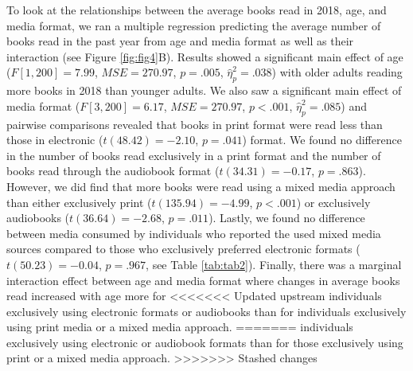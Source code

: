 \documentclass[man, fleqn, noextraspace]{apa6}
\theoremstyle{definition}
\theoremstyle{definition}
\theoremstyle{definition}
\theoremstyle{remark}
\begin{document}
To look at the relationships between the average books read in 2018,
age, and media format, we ran a multiple regression predicting the
average number of books read in the past year from age and media format
as well as their interaction (see Figure \ref{fig:fig4}B). Results
showed a significant main effect of age (\(F[1, 200] = 7.99\),
\(\mathit{MSE} = 270.97\), \(p = .005\), \(\hat{\eta}^2_p = .038\)) with
older adults reading more books in 2018 than younger adults. We also saw
a significant main effect of media format (\(F[3, 200] = 6.17\),
\(\mathit{MSE} = 270.97\), \(p < .001\), \(\hat{\eta}^2_p = .085\)) and
pairwise comparisons revealed that books in print format were read less
than those in electronic (\(t(48.42) = -2.10\), \(p = .041\)) format. We
found no difference in the number of books read exclusively in a print
format and the number of books read through the audiobook format
(\(t(34.31) = -0.17\), \(p = .863\)). However, we did find that more
books were read using a mixed media approach than either exclusively
print (\(t(135.94) = -4.99\), \(p < .001\)) or exclusively audiobooks
(\(t(36.64) = -2.68\), \(p = .011\)). Lastly, we found no difference
between media consumed by individuals who reported the used mixed media
sources compared to those who exclusively preferred electronic formats
(\(t(50.23) = -0.04\), \(p = .967\), see Table \ref{tab:tab2}). Finally,
there was a marginal interaction effect between age and media format
where changes in average books read increased with age more for
<<<<<<< Updated upstream
individuals exclusively using electronic formats or audiobooks than for
individuals exclusively using print media or a mixed media approach.
=======
individuals exclusively using electronic or audiobook formats than for
those exclusively using print or a mixed media approach.
>>>>>>> Stashed changes
\end{document}
